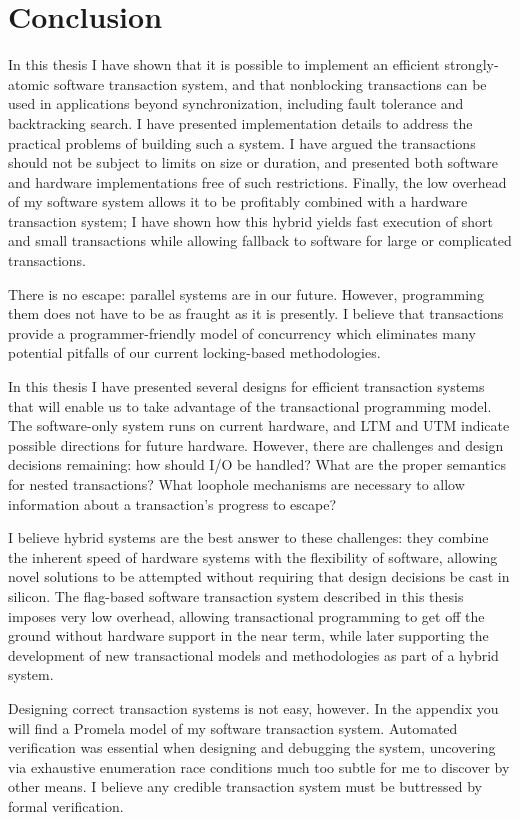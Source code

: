\chapter{Conclusion}\label{cha:concl}

In this thesis I have shown that it is possible to implement an
efficient strongly-atomic software transaction system, and that
nonblocking transactions can be used in applications beyond
synchronization, including fault tolerance and backtracking search.  I
have presented implementation details to address the practical
problems of building such a system.  I have argued the transactions
should not be subject to limits on size or duration, and presented
both software and hardware implementations free of such restrictions.
Finally, the low overhead of my software system allows it to be
profitably combined with a hardware transaction system; I have shown
how this hybrid yields fast execution of short and small transactions
while allowing fallback to software for large or complicated
transactions.

There is no escape: parallel systems are in our future.  However,
programming them does not have to be as fraught as it is presently.
I believe that transactions provide a programmer-friendly model
of concurrency which eliminates many potential pitfalls of our
current locking-based methodologies.

In this thesis I have presented several designs for efficient
transaction systems that will enable us to take advantage of the
transactional programming model.  The software-only system runs on
current hardware, and LTM and UTM indicate possible directions for future
hardware.  However, there are challenges and design decisions
remaining: how should I/O be handled?  What are the proper semantics
for nested transactions?  What loophole mechanisms are necessary to
allow information about a transaction's progress to escape?

I believe hybrid systems are the best answer to these challenges: they
combine the
inherent speed of hardware systems with the
flexibility of software, allowing novel solutions to be attempted
without requiring that design decisions be cast in silicon.  The
flag-based software transaction system described in this thesis
imposes very low overhead, allowing transactional
programming to get off the ground without hardware support in the near
term, while later supporting the development of new transactional models and
methodologies as part of a hybrid system.

Designing correct transaction systems is not easy, however.  In the
appendix you will find a Promela model of my software transaction
system.  Automated verification was essential when designing and
debugging the system, uncovering via exhaustive enumeration race
conditions much too subtle for me to discover by other means.  I
believe any credible transaction system must be buttressed by formal
verification.

